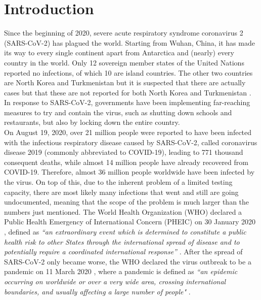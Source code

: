 \documentclass[12pt]{article}
\begin{document}
	\newpage
	
	\tableofcontents
	
	\newpage
	
	\section{Introduction} \label{sec:introduction}
	Since the beginning of 2020, severe acute respiratory syndrome coronavirus 2 (SARS-CoV-2) has plagued the world. Starting from Wuhan, China, it has made its way to every single continent apart from Antarctica and (nearly) every country in the world. Only 12 sovereign member states of the United Nations reported no infections, of which 10 are island countries. The other two countries are North Korea and Turkmenistan but it is suspected that there are actually cases but that these are not reported for both North Korea \parencite{businessinsider2020dprk, nebehay2020dprk} and Turkmenistan \parencite{hrw2020turkmenistan, mackinnon2020turkmenistan}. In response to SARS-CoV-2, governments have been implementing far-reaching measures to try and contain the virus, such as shutting down schools and restaurants, but also by locking down the entire country. \\
	
	On August 19, 2020, over 21 million people were reported to have been infected with the infectious respiratory disease caused by SARS-CoV-2, called coronavirus disease 2019 (commonly abbreviated to COVID-19), leading to 771 thousand consequent deaths, while almost 14 million people have already recovered from COVID-19. Therefore, almost 36 million people worldwide have been infected by the virus. On top of this, due to the inherent problem of a limited testing capacity, there are most likely many infections that went and still are going undocumented, meaning that the scope of the problem is much larger than the numbers just mentioned. The World Health Organization (WHO) declared a Public Health Emergency of International Concern (PHEIC) on 30 January 2020 \parencite{who2020pheic}, defined as \textit{``an extraordinary event which is determined to constitute a public health risk to other States through the international spread of disease and to potentially require a coordinated international response”} \parencite{who2019ihr}. After the spread of SARS-CoV-2 only became worse, the WHO declared the virus outbreak to be a pandemic on 11 March 2020 \parencite{who2020pandemic}, where a pandemic is defined as \textit{``an epidemic occurring on worldwide or over a very wide area, crossing international boundaries, and usually affecting a large number of people"} \parencite{porta2014dictionary}. \\
	
\end{document}
